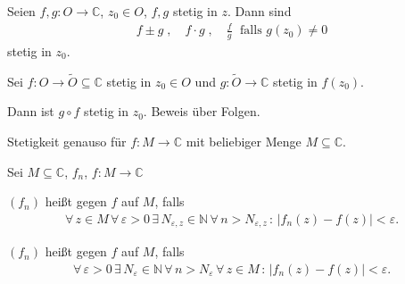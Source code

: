 \begin{theorem}[Satz]
  \begin{enum-arab}
    \item Seien $f,g : O \to \mathbb{C}$, $z_0 \in O$, $f,g$ stetig in $z$. Dann sind
    \begin{align*}
      f \pm g \; , \quad f \cdot g \; , \quad \frac{f}{g} \; \text{ falls $g(z_0) \neq 0$}
    \end{align*}
    stetig in $z_0$.
    
    \item Sei $f : O \to \widetilde{O} \subseteq \mathbb{C}$ stetig in $z_0 \in O$ und $g : \widetilde{O} \to \mathbb{C}$ stetig in $f(z_0)$.

    Dann ist $g \circ f$ stetig in $z_0$. Beweis über Folgen.
  \end{enum-arab}
\end{theorem}

\begin{notice}
  Stetigkeit genauso für $f: M \to \mathbb{C}$ mit beliebiger Menge $M \subseteq \mathbb{C}$.
\end{notice}

\begin{theorem}[Funktionenfolgen]
  Sei $M \subseteq \mathbb{C}$, $f_n$, $f : M \to \mathbb{C}$
  \begin{enum-arab}
    \item $(f_n)$ heißt  gegen $f$ auf $M$, falls
    \begin{align*}
      \forall \, z \in M \, \forall \, \varepsilon > 0 \, \exists \, N_{\varepsilon,z} \in \mathbb{N} \, \forall \, n > N_{\varepsilon,z} \, : \, |f_n(z) - f(z)| < \varepsilon.
    \end{align*}
    \item $(f_n)$ heißt  gegen $f$ auf $M$, falls
    \begin{align*}
      \forall \, \varepsilon > 0 \, \exists \, N_{\varepsilon} \in \mathbb{N} \, \forall \, n > N_{\varepsilon} \, \forall \, z \in M \, : \, |f_n(z) - f(z)| < \varepsilon.
    \end{align*}
  \end{enum-arab}
\end{theorem}

